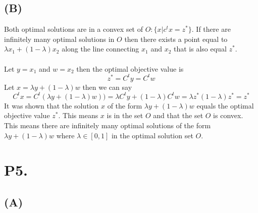 \documentclass[12pt]{article}
\begin{document}
\subsection*{(B)}
Both optimal solutions are in a convex set of $O : \{x | c^tx = z^*\}$.  If there are infinitely many optimal solutions in $O$ then there exists a point equal to $\lambda x_{1} + (1 - \lambda)x_{2}$ along the line connecting $x_{1}$ and $x_{2}$ that is also equal $z^*$.\\
\\
\noindent
Let $y = x_{1}$ and $w = x_{2}$ then the optimal objective value is
$$
  z^* = C^ty = C^tw
$$
Let $x = \lambda y + (1 - \lambda)w$ then we can say 
$$ 
  C^tx = C^t(\lambda y + (1 - \lambda)w)) = \lambda C^ty + (1 - \lambda)C^tw = \lambda z^* (1 - \lambda) z^* = z^*
$$
It was shown that the solution $x$ of the form $\lambda y + (1 - \lambda)w$ equals the optimal objective value $z^*$.  This means $x$ is in the set $O$ and that the set $O$ is convex.  This means there are infinitely many optimal solutions of the form $\lambda y + (1 - \lambda)w$ where $\lambda \in [0,1]$ in the optimal solution set $O$.

\newpage

\section*{P5.}
\subsection*{(A)}
\end{document}
